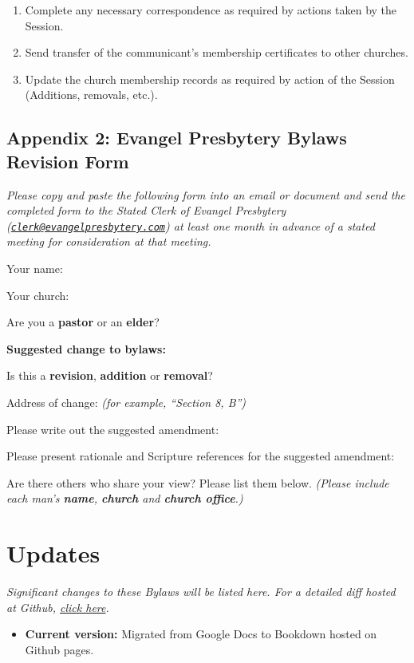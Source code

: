 \documentclass[
]{book}
\providecommand{\tightlist}{%
  \setlength{\itemsep}{0pt}\setlength{\parskip}{0pt}}
\begin{document}
\begin{enumerate}
\def\labelenumi{\arabic{enumi}.}
\tightlist
\item
  Complete any necessary correspondence as required by actions taken by the Session.
\item
  Send transfer of the communicant's membership certificates to other churches.
\item
  Update the church membership records as required by action of the Session (Additions, removals, etc.).
\end{enumerate}

\hypertarget{appendix-2-evangel-presbytery-bylaws-revision-form}{%
\section*{Appendix 2: Evangel Presbytery Bylaws Revision Form}\label{appendix-2-evangel-presbytery-bylaws-revision-form}}

\emph{Please copy and paste the following form into an email or document and send the completed form to the Stated Clerk of Evangel Presbytery (\href{mailto:clerk@evangelpresbytery.com}{\nolinkurl{clerk@evangelpresbytery.com}}) at least one month in advance of a stated meeting for consideration at that meeting.}

Your name:

Your church:

Are you a \textbf{pastor} or an \textbf{elder}?

\textbf{Suggested change to bylaws:}

Is this a \textbf{revision}, \textbf{addition} or \textbf{removal}?

Address of change: \emph{(for example, ``Section 8, B'')}

Please write out the suggested amendment:

Please present rationale and Scripture references for the suggested amendment:

Are there others who share your view? Please list them below. \emph{(Please include each man's \textbf{name}, \textbf{church} and \textbf{church office}.)}

\hypertarget{updates}{%
\chapter*{Updates}\label{updates}}

\emph{Significant changes to these Bylaws will be listed here. For a detailed diff hosted at Github, \href{https://github.com/Evangel-Presbytery/evangel-bylaws}{click here}.}

\begin{itemize}
\tightlist
\item
  \textbf{Current version:} Migrated from Google Docs to Bookdown hosted on Github pages.
\end{itemize}
\end{document}
